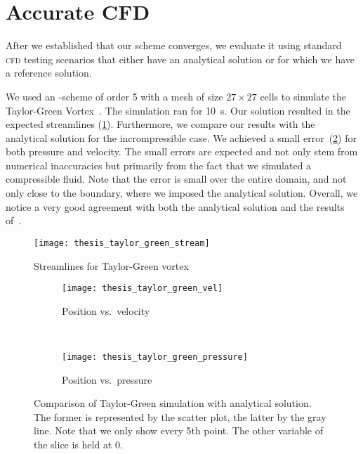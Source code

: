 \section{Accurate CFD}\label{sec:cfd}
After we established that our scheme converges, we evaluate it using standard \textsc{cfd} testing scenarios that either have an analytical solution or for which we have a reference solution.

We used an \aderdg{}-scheme of order 5 with a mesh of size $27 \times 27$ cells to simulate the Taylor-Green Vortex~.
The simulation ran for \SI{10}{\s}.
Our solution resulted in the expected streamlines (\cref{fig:taylor-green-streamlines}).
Furthermore, we compare our results with the analytical solution for the incrompressible case.
We achieved a small error~(\cref{fig:taylor-green-result}) for both pressure and velocity.
The small errors are expected and not only stem from numerical inaccuracies but primarily from the fact that we simulated a compressible fluid.
Note that the error is small over the entire domain, and not only close to the boundary, where we imposed the analytical solution.
Overall, we notice a very good agreement with both the analytical solution and the results of~\cite{dumbser2016high}.

\begin{figure}[htb]
  \centering
  \texttt{[image: thesis\_taylor\_green\_stream]}
  \caption{\label{fig:taylor-green-streamlines}%
    Streamlines for Taylor-Green vortex}
\end{figure}

\begin{figure}[htb]
  \centering
  \begin{subfigure}[t]{0.5\textwidth}
    \centering
    \texttt{[image: thesis\_taylor\_green\_vel]}
    \caption{Position vs.\ velocity}
  \end{subfigure}~%
  \begin{subfigure}[t]{0.5\textwidth}
    \centering
    \texttt{[image: thesis\_taylor\_green\_pressure]}
    \caption{Position vs.\ pressure}
  \end{subfigure}
  \caption{\label{fig:taylor-green-result}%
    Comparison of Taylor-Green simulation with analytical solution.
    The former is represented by the scatter plot, the latter by the gray line.
    Note that we only show every 5th point.
    The other variable of the slice is held at 0.}
\end{figure}

